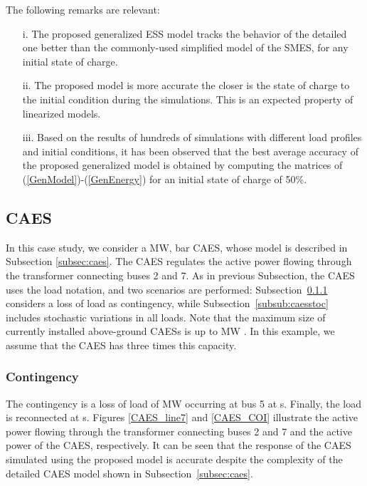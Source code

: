 \documentclass[journal, a4paper]{IEEEtran}
\begin{document}
The following remarks are relevant:
\begin{itemize}
\item[i. ] The proposed generalized ESS model tracks the beha\-vior of the detailed one better than
the commonly-used simplified model of the SMES, for any initial state of charge.
\item[ii. ] The proposed model is more accurate the closer is the state of charge to the initial condition
during the simulations. This is an expected property of linearized models.
\item[iii. ] Based on the results of hundreds of simulations with different load profiles and initial 
conditions, it has been observed that the best average accuracy of the proposed
generalized model is obtained by computing the matrices of (\ref{GenModel})-(\ref{GenEnergy}) for an
initial state of charge of 50\%.
\end{itemize}





\subsection{CAES}
\label{subsec:caesTDS}

In this case study, we consider a  MW,  bar CAES, whose
model is described in Subsection \ref{subsec:caes}. The CAES regulates
the active power flowing through the transformer connecting buses 2
and 7.  As in previous Subsection, the CAES uses the load
notation, and two scenarios are performed:
Subsection~\ref{subsub:caesdeterm} considers a loss of load as contingency,
while Subsection~\ref{subsub:caesstoc} includes stochastic variations in all loads.
Note that the maximum size of currently installed
above-ground CAESs is up to  MW \cite{ibrahim:08}.  In this
example, we assume that the CAES has three times this capacity. \\

\subsubsection{Contingency}
\label{subsub:caesdeterm}
The contingency is a loss of load of  MW occurring
at bus 5 at  s.  Finally, the load is reconnected at 
s.  Figures \ref{CAES_line7} and \ref{CAES_COI} illustrate the active
power flowing through the transformer connecting buses 2 and 7 and the
active power of the CAES, respectively. It can be seen
  that the response of the CAES simulated using the proposed model is
  accurate despite the complexity of the detailed CAES model shown in
  Subsection~\ref{subsec:caes}.
\end{document}
